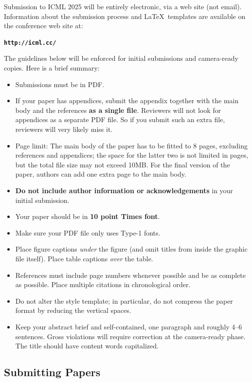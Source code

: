 \documentclass{article}
\theoremstyle{plain}
\theoremstyle{definition}
\theoremstyle{remark}
\begin{document}
Submission to ICML 2025 will be entirely electronic, via a web site
(not email). Information about the submission process and \LaTeX\ templates
are available on the conference web site at:
\begin{center}
\textbf{\texttt{http://icml.cc/}}
\end{center}

The guidelines below will be enforced for initial submissions and
camera-ready copies. Here is a brief summary:
\begin{itemize}
\item Submissions must be in PDF\@. 
\item If your paper has appendices, submit the appendix together with the main body and the references \textbf{as a single file}. Reviewers will not look for appendices as a separate PDF file. So if you submit such an extra file, reviewers will very likely miss it.
\item Page limit: The main body of the paper has to be fitted to 8 pages, excluding references and appendices; the space for the latter two is not limited in pages, but the total file size may not exceed 10MB. For the final version of the paper, authors can add one extra page to the main body.
\item \textbf{Do not include author information or acknowledgements} in your
    initial submission.
\item Your paper should be in \textbf{10 point Times font}.
\item Make sure your PDF file only uses Type-1 fonts.
\item Place figure captions \emph{under} the figure (and omit titles from inside
    the graphic file itself). Place table captions \emph{over} the table.
\item References must include page numbers whenever possible and be as complete
    as possible. Place multiple citations in chronological order.
\item Do not alter the style template; in particular, do not compress the paper
    format by reducing the vertical spaces.
\item Keep your abstract brief and self-contained, one paragraph and roughly
    4--6 sentences. Gross violations will require correction at the
    camera-ready phase. The title should have content words capitalized.
\end{itemize}

\subsection{Submitting Papers}
\end{document}
